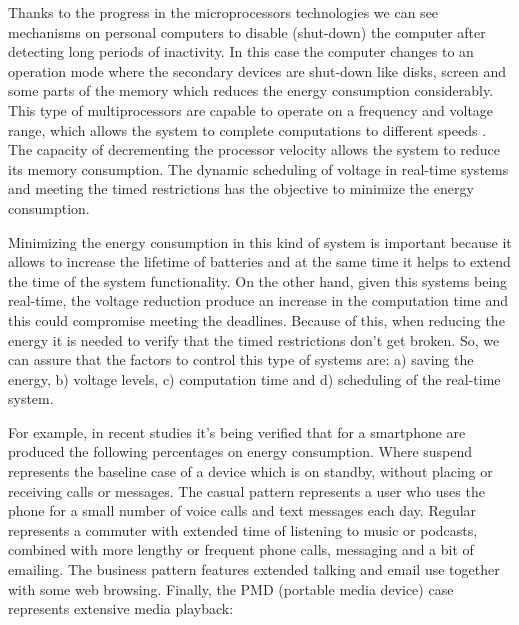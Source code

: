\documentclass[conference]{IEEEtran}
\begin{document}
 Thanks to the progress in the microprocessors technologies we can see mechanisms on personal computers to disable (shut-down) the computer after detecting long periods of inactivity. In this case the computer changes to an operation mode where the secondary devices are shut-down like disks, screen and some parts of the memory which reduces the energy consumption considerably. This type of multiprocessors are capable to operate on a frequency and voltage range, which allows the system to complete computations to different speeds \cite{PADM01}. The capacity of decrementing the processor velocity allows the system to reduce its memory consumption. The dynamic scheduling of voltage in real-time systems and meeting the timed restrictions has the objective to minimize the energy consumption.

 Minimizing the energy consumption in this kind of system is important because it allows to increase the lifetime of batteries and at the same time it helps to extend the time of the system functionality. On the other hand, given this systems being real-time, the voltage reduction produce an increase in the computation time and this could compromise meeting the deadlines. Because of this, when reducing the energy it is needed to verify that the timed restrictions don't get broken. So, we can assure that the factors to control this type of systems are: a) saving the energy, b) voltage levels, c) computation time and d) scheduling of the real-time system.
 
 For example, in recent studies \cite{Carroll_ananalysis} it's being verified that for a smartphone are produced the following percentages on energy consumption. Where suspend represents the baseline case of a device which is on standby, without placing or receiving calls or messages. The casual pattern represents a user who uses the phone for a small number of voice calls and text messages each day. Regular represents a commuter with extended time of listening to music or podcasts, combined with more lengthy or frequent phone calls, messaging and a bit of emailing. The business pattern features extended talking and email use together with some web browsing. Finally, the PMD (portable media device) case represents extensive media playback:
 
\end{document}
